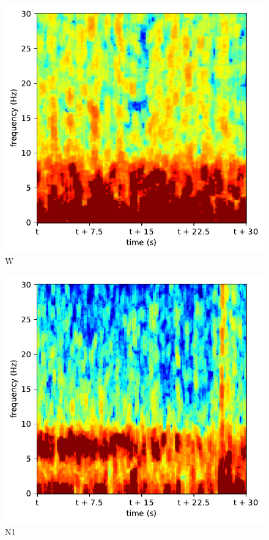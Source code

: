 \begin{subfigure}{.16\textwidth}
  \centering
  \includegraphics[width=1\linewidth]{./pics/class_clean_0}
  \caption{W}
  \label{fig_1_11}
\end{subfigure}%
\begin{subfigure}{.16\textwidth}
  \centering
  \includegraphics[width=1\linewidth]{./pics/class_clean_1}
  \caption{N1}
  \label{fig_1_12}
\end{subfigure}%
